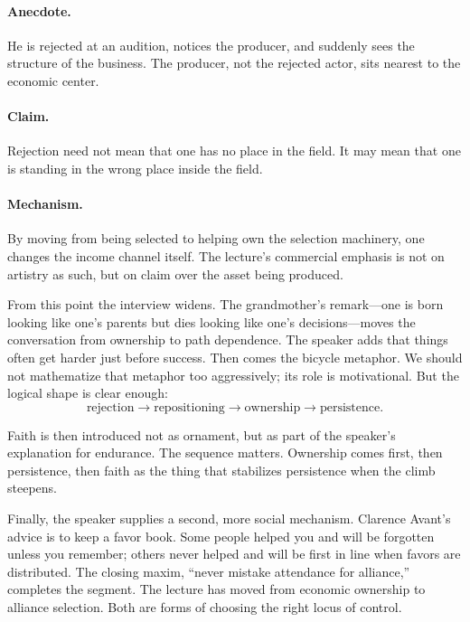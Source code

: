 \paragraph{Anecdote.} He is rejected at an audition, notices the producer, and suddenly sees the structure of the business. The producer, not the rejected actor, sits nearest to the economic center.

\paragraph{Claim.} Rejection need not mean that one has no place in the field. It may mean that one is standing in the wrong place inside the field.

\paragraph{Mechanism.} By moving from being selected to helping own the selection machinery, one changes the income channel itself. The lecture's commercial emphasis is not on artistry as such, but on claim over the asset being produced.

From this point the interview widens. The grandmother's remark---one is born looking like one's parents but dies looking like one's decisions---moves the conversation from ownership to path dependence. The speaker adds that things often get harder just before success. Then comes the bicycle metaphor. We should not mathematize that metaphor too aggressively; its role is motivational. But the logical shape is clear enough:
\begin{equation}
\text{rejection}
\to
\text{repositioning}
\to
\text{ownership}
\to
\text{persistence}.
\end{equation}

Faith is then introduced not as ornament, but as part of the speaker's explanation for endurance. The sequence matters. Ownership comes first, then persistence, then faith as the thing that stabilizes persistence when the climb steepens.

Finally, the speaker supplies a second, more social mechanism. Clarence Avant's advice is to keep a favor book. Some people helped you and will be forgotten unless you remember; others never helped and will be first in line when favors are distributed. The closing maxim, ``never mistake attendance for alliance,'' completes the segment. The lecture has moved from economic ownership to alliance selection. Both are forms of choosing the right locus of control.

